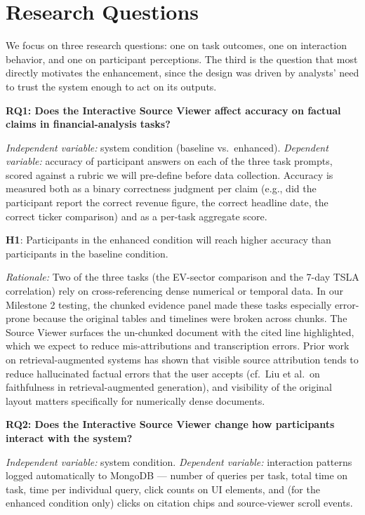 
\section{Research Questions}

We focus on three research questions: one on task outcomes, one on interaction behavior, and one on participant perceptions. The third is the question that most directly motivates the enhancement, since the design was driven by analysts' need to trust the system enough to act on its outputs.

\textbf{RQ1: Does the Interactive Source Viewer affect accuracy on factual claims in financial-analysis tasks?}

\textit{Independent variable:} system condition (baseline vs.\ enhanced). \textit{Dependent variable:} accuracy of participant answers on each of the three task prompts, scored against a rubric we will pre-define before data collection. Accuracy is measured both as a binary correctness judgment per claim (e.g., did the participant report the correct revenue figure, the correct headline date, the correct ticker comparison) and as a per-task aggregate score.

\textbf{H1}: Participants in the enhanced condition will reach higher accuracy than participants in the baseline condition.

\textit{Rationale:} Two of the three tasks (the EV-sector comparison and the 7-day TSLA correlation) rely on cross-referencing dense numerical or temporal data. In our Milestone 2 testing, the chunked evidence panel made these tasks especially error-prone because the original tables and timelines were broken across chunks. The Source Viewer surfaces the un-chunked document with the cited line highlighted, which we expect to reduce mis-attributions and transcription errors. Prior work on retrieval-augmented systems has shown that visible source attribution tends to reduce hallucinated factual errors that the user accepts (cf.~Liu et al.\ on faithfulness in retrieval-augmented generation), and visibility of the original layout matters specifically for numerically dense documents.

\medskip

\textbf{RQ2: Does the Interactive Source Viewer change how participants interact with the system?}

\textit{Independent variable:} system condition. \textit{Dependent variable:} interaction patterns logged automatically to MongoDB --- number of queries per task, total time on task, time per individual query, click counts on UI elements, and (for the enhanced condition only) clicks on citation chips and source-viewer scroll events.

